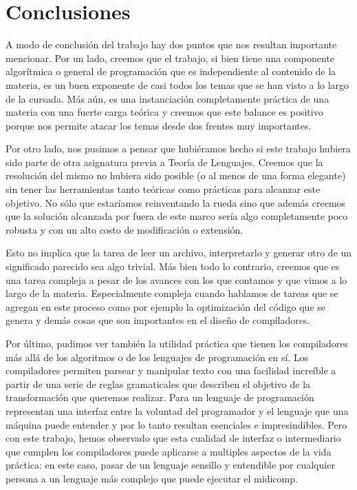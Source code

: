 \section{Conclusiones}

A modo de conclusión del trabajo hay dos puntos que nos resultan importante mencionar. Por un lado, creemos que el trabajo, si bien
tiene una componente algorítmica o general de programación que es independiente al contenido de la materia, es un buen exponente
de casi todos los temas que se han visto a lo largo de la cursada. Más aún, es una instanciación completamente práctica de una
materia con una fuerte carga teórica y creemos que este balance es positivo porque nos permite atacar los temas desde dos
frentes muy importantes.

Por otro lado, nos pusimos a pensar que hubiéramos hecho si este trabajo hubiera sido parte de otra asignatura previa a 
Teoría de Lenguajes. Creemos que la resolución del mismo no hubiera sido posible (o al menos de una forma elegante) sin
tener las herramientas tanto teóricas como prácticas para alcanzar este objetivo. No sólo que estaríamos reinventando la rueda
sino que además creemos que la solución alcanzada por fuera de este marco sería algo completamente poco robusta y 
con un alto costo de modificación o extensión.

Esto no implica que la tarea de leer un archivo, interpretarlo y generar otro de un significado parecido sea algo trivial.
Más bien todo lo contrario, creemos que es una tarea compleja a pesar de los avances con los que contamos y que 
vimos a lo largo de la materia. Especialmente compleja cuando hablamos de tareas que se agregan en este proceso como
por ejemplo la optimización del código que se genera y demás cosas que son importantes en el diseño de compiladores.

Por último, pudimos ver también la utilidad práctica que tienen los compiladores más allá de los algoritmos o de los lenguajes de programación en sí. Los compiladores permiten parsear y manipular texto con una facilidad increíble a partir de una serie de reglas gramaticales que describen el objetivo de la transformación que queremos realizar. Para un lenguaje de programación representan una interfaz entre la voluntad del programador y el lenguaje que una máquina puede entender y por lo tanto resultan esenciales e impresindibles. Pero con este trabajo, hemos observado que esta cualidad de interfaz o intermediario que cumplen los compiladores puede aplicarse a multiples aspectos de la vida práctica: en este caso, pasar de un lenguaje sensillo y entendible por cualquier persona a un lenguaje más complejo que puede ejecutar el midicomp.